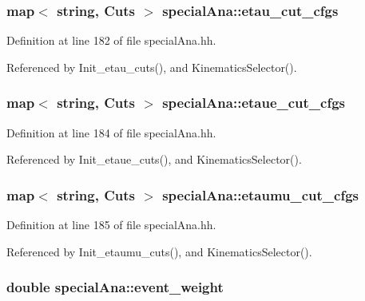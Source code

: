 \subsubsection[{etau\-\_\-cut\-\_\-cfgs}]{\setlength{\rightskip}{0pt plus 5cm}map$<$ string, {\bf Cuts} $>$ special\-Ana\-::etau\-\_\-cut\-\_\-cfgs}\label{classspecialAna_aae200ba5c12c48ca4dadc47e657a14fc}


Definition at line 182 of file special\-Ana.\-hh.



Referenced by Init\-\_\-etau\-\_\-cuts(), and Kinematics\-Selector().

\subsubsection[{etaue\-\_\-cut\-\_\-cfgs}]{\setlength{\rightskip}{0pt plus 5cm}map$<$ string, {\bf Cuts} $>$ special\-Ana\-::etaue\-\_\-cut\-\_\-cfgs}\label{classspecialAna_abd425daefdae175f64d5d2ec8eaeb859}


Definition at line 184 of file special\-Ana.\-hh.



Referenced by Init\-\_\-etaue\-\_\-cuts(), and Kinematics\-Selector().

\subsubsection[{etaumu\-\_\-cut\-\_\-cfgs}]{\setlength{\rightskip}{0pt plus 5cm}map$<$ string, {\bf Cuts} $>$ special\-Ana\-::etaumu\-\_\-cut\-\_\-cfgs}\label{classspecialAna_a649fbc7d8b73e8227e7844a3d7d2f7d5}


Definition at line 185 of file special\-Ana.\-hh.



Referenced by Init\-\_\-etaumu\-\_\-cuts(), and Kinematics\-Selector().

\subsubsection[{event\-\_\-weight}]{\setlength{\rightskip}{0pt plus 5cm}double special\-Ana\-::event\-\_\-weight}\label{classspecialAna_aaafb641b3e4372a247d24b678ed4a549}


